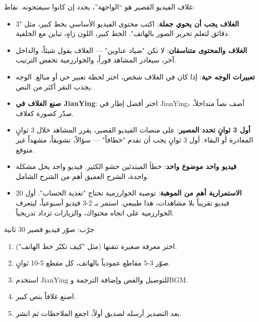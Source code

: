 
غلاف الفيديو القصير هو “الواجهة”، يحدد إن كانوا سيفتحونه. نقاط:

\begin{itemize}
  \item \textbf{الغلاف يجب أن يحوي جملة}: اكتب محتوى الفيديو الأساسي بخط كبير، مثل "3 دقائق لتعلم تحرير الصور بالهاتف". الخط كبير، اللون زاهٍ، تباين مع الخلفية.
  \item \textbf{الغلاف والمحتوى متناسقان}: لا تكن "صياد عناوين" — الغلاف يقول شيئاً، والداخل آخر، سيغادر المشاهد فوراً، والخوارزمية تخفض الترتيب.
  \item \textbf{تعبيرات الوجه حية}: إذا كان في الغلاف شخص، اختر لحظة تعبير حي أو مبالغ. الوجه يجذب النقر أكثر من النص.
  \item \textbf{صنع الغلاف في JianYing}: اختر أفضل إطار في JianYing، أضف نصاً متداخلاً، صدّر كصورة كغلاف.
\end{itemize}


\begin{itemize}
  \item \textbf{أول 3 ثوانٍ تحدد المصير}: على منصات الفيديو القصير، يقرر المشاهد خلال 3 ثوانٍ المغادرة أو البقاء. أول 3 ثوانٍ يجب أن تقدم "خطافاً" — سؤالاً، تشويقاً، مشهداً غير متوقع.
  \item \textbf{فيديو واحد موضوع واحد}: خطأ المبتدئين حشو الكثير. فيديو واحد يحل مشكلة واحدة، الشرح العميق أهم من الشرح الشامل.
  \item \textbf{الاستمرارية أهم من الموهبة}: توصية الخوارزمية تحتاج "تغذية الحساب". أول 20 فيديو تقريباً بلا مشاهدات، هذا طبيعي. استمر بـ 2-3 فيديو أسبوعياً، ليتعرف الخوارزمية على اتجاه محتواك، والزيارات تزداد تدريجياً.
\end{itemize}

\begin{tcbpractice}{جرّب: صوّر فيديو قصير 30 ثانية}
\begin{enumerate}
  \item اختر معرفة صغيرة تتقنها (مثل "كيف تكبّر خط الهاتف").
  \item صوّر 3-5 مقاطع عمودياً بالهاتف، كل مقطع 5-10 ثوانٍ.
  \item استخدم JianYing للتوصيل والقص وإضافة الترجمة وBGM.
  \item اصنع غلافاً بنص كبير.
  \item بعد التصدير أرسله لصديق أولاً، اجمع الملاحظات ثم انشر.
\end{enumerate}

\end{tcbpractice}

